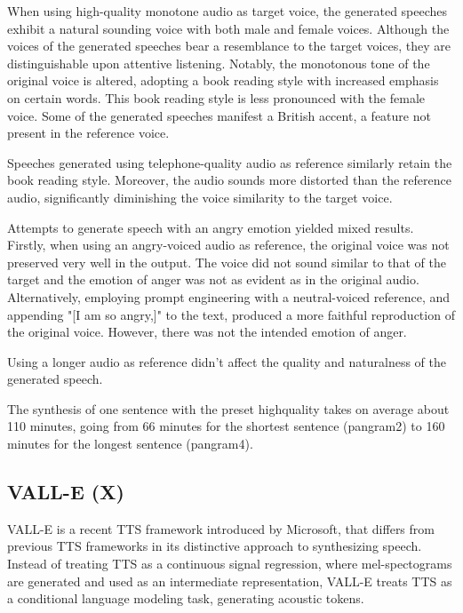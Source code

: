 When using high-quality monotone audio as target voice, the generated speeches exhibit a natural sounding voice with both male and female voices. Although the voices of the generated speeches bear a resemblance to the target voices, they are distinguishable upon attentive listening. Notably, the monotonous tone of the original voice is altered, adopting a book reading style with increased emphasis on certain words. This book reading style is less pronounced with the female voice. Some of the generated speeches manifest a British accent, a feature not present in the reference voice.


Speeches generated using telephone-quality audio as reference similarly retain the book reading style. Moreover, the audio sounds more distorted than the reference audio, significantly diminishing the voice similarity to the target voice.

Attempts to generate speech with an angry emotion yielded mixed results. Firstly, when using an angry-voiced audio as reference, the original voice was not preserved very well in the output. The voice did not sound similar to that of the target and the emotion of anger was not as evident as in the original audio. Alternatively, employing prompt engineering with a neutral-voiced reference, and appending "[I am so angry,]" to the text, produced a more faithful reproduction of the original voice. However, there was not the intended emotion of anger.

Using a longer audio as reference didn't affect the quality and naturalness of the generated speech.

The synthesis of one sentence with the preset high\textunderscore quality takes on average about 110 minutes, going from 66 minutes for the shortest sentence (pangram2) to 160 minutes for the longest sentence (pangram4).





\subsection{VALL-E (X)}
VALL-E\cite{wang2301neural} is a recent TTS framework introduced by Microsoft, that differs from previous TTS frameworks in its distinctive approach to synthesizing speech. Instead of treating TTS as a continuous signal regression, where mel-spectograms are generated and used as an intermediate representation, VALL-E treats TTS as a conditional language modeling task, generating acoustic tokens.

